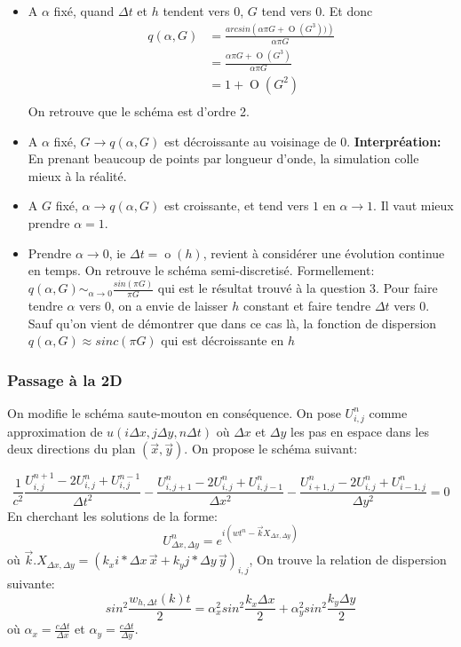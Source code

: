 \documentclass{article}
\newcommand{\BigO}[1]{\ensuremath{\operatorname{O}\left(#1\right)}}
\newcommand{\SmallO}[1]{\ensuremath{\operatorname{o}\left(#1\right)}}
\newcommand{\BigF}[2]{\ensuremath{#1 \left(#2\right)}}
\newcommand{\Wrap}[1]{\ensuremath{\left(#1\right)}}
\begin{document}
\begin{itemize}
	\item 
A $\alpha$ fixé, quand $ \Delta t$ et $h$ tendent vers 0, $G$ tend vers 0. 
Et donc 
\begin{align*}
q(\alpha, G) 
&= \frac{\BigF{arcsin}{\alpha \pi G + \BigO{G^3} ) }}{\alpha \pi G} \\
&= \frac{\alpha \pi G  + \BigO{G^3} }{\alpha \pi G} \\
&= 1  + \BigO{G^2} \\
\end{align*}
On retrouve que le schéma est d'ordre 2.

	\item 
A $\alpha$ fixé, $G \to q(\alpha, G)$ est décroissante au voisinage de $0$. \textbf{Interpréation:} En prenant beaucoup de points par longueur d'onde,
la simulation colle mieux à la réalité.

	\item 
A $G$ fixé, $\alpha \to q(\alpha, G)$ est croissante, et tend vers $1$ en $\alpha \to 1$. Il vaut mieux prendre $\alpha = 1$.
	
	\item 
Prendre $\alpha \to 0$, ie $\Delta t =  \SmallO{h}$, revient à considérer une évolution continue en temps. On retrouve le schéma semi-discretisé. Formellement:
$ q(\alpha, G) \sim_{\alpha \to 0} \frac{sin(\pi G)}{\pi G}$ 
qui est le résultat trouvé à la question 3. 
Pour faire tendre $\alpha$ vers $0$, on a envie de laisser $h$ constant et faire tendre $\Delta t$ vers 0. Sauf qu'on vient de démontrer que dans ce cas là, la fonction de dispersion $q(\alpha, G) \approx sinc(\pi G)$ qui est décroissante en $h$


\end{itemize}




\subsubsection*{Passage à la 2D}
On modifie le schéma saute-mouton en conséquence. On pose $U^n_{i,j}$ comme approximation de $u(i \Delta x, j \Delta y, n \Delta t)$ 
où $\Delta x$ et $\Delta y$ les pas en espace dans les deux directions du plan $(\vec{x}, \vec{y})$. On propose le schéma suivant:

$$ \frac{1}{c^2} \frac{U^{n+1}_{i,j} - 2U^{n}_{i,j} + U^{n-1}_{i,j}}{\Delta t^2} - 
\frac{U^{n}_{i,j+1} - 2U^{n}_{i,j}+U^{n}_{i,j-1}}{\Delta x^2} 
-\frac{U^{n}_{i+1,j} - 2U^{n}_{i,j}+U^{n}_{i-1,j}}{\Delta y^2}
= 0$$
En cherchant les solutions de la forme:
$$ U^n_{\Delta x, \Delta y} = e^{i(w t^n - \vec{k} X_{\Delta x, \Delta y})} $$
où $\vec{k} . X_{\Delta x, \Delta y} = \Wrap{k_x i*\Delta x \, \vec{x} + k_y j*\Delta y \, \vec{y}}_{i, j} $, 
On trouve la relation de dispersion suivante:
$$ sin^2 \frac{w_{h, \Delta t} (k) t}{2} = \alpha_x ^ 2 sin^2 \frac{k_x \Delta x}{2} + \alpha_y ^ 2  sin^2 \frac{k_y \Delta y}{2} $$
où $\alpha_x = \frac{c \Delta t}{\Delta x}$ et  $ \alpha_y = \frac{c \Delta t}{\Delta y}$.
\end{document}
